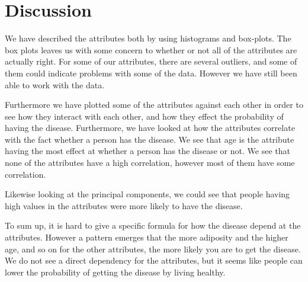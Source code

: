 \section{Discussion}
We have described the attributes both by using histograms and box-plots. The box plots leaves us with some concern to whether or not all of the attributes are actually right. For some of our attributes, there are several outliers, and some of them could indicate problems with some of the data. However we have still been able to work with the data.

Furthermore we have plotted some of the attributes against each other in order to see how they interact with each other, and how they effect the probability of having the disease. Furthermore, we have looked at how the attributes correlate with the fact whether a person has the disease. We see that age is the attribute having the most effect at whether a person has the disease or not. We see that none of the attributes have a high correlation, however most of them have some correlation.

Likewise looking at the principal components, we could see that people having high values in the attributes were more likely to have the disease.

To sum up, it is hard to give a specific formula for how the disease depend at the attributes. However a pattern emerges that the more adiposity and the higher age, and so on for the other attributes, the more likely you are to get the disease. We do not see a direct dependency for the attributes, but it seems like people can lower the probability of getting the disease by living healthy.